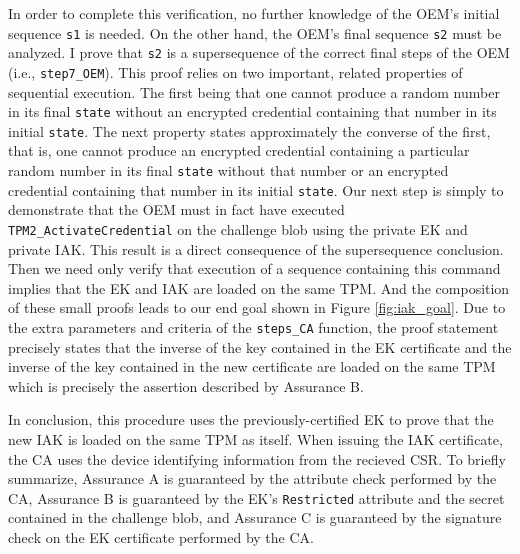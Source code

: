 \documentclass[runningheads]{llncs}
\begin{document}
In order to complete this verification, no further knowledge of the OEM's initial sequence \verb|s1| is needed.
On the other hand, the OEM's final sequence \verb|s2| must be analyzed.
I prove that \verb|s2| is a supersequence of the correct final steps of the OEM (i.e., \verb|step7_OEM|). This proof relies on two important, related properties of sequential execution. The first being that one cannot produce a random number in its final \verb|state| without an encrypted credential containing that number in its initial \verb|state|. The next property states approximately the converse of the first, that is, one cannot produce an encrypted credential containing a particular random number in its final \verb|state| without that number or an encrypted credential containing that number in its initial \verb|state|.
Our next step is simply to demonstrate that the OEM must in fact have executed \verb|TPM2_ActivateCredential| on the challenge blob using the private EK and private IAK. This result is a direct consequence of the supersequence conclusion. Then we need only verify that execution of a sequence containing this command implies that the EK and IAK are loaded on the same TPM. And the composition of these small proofs leads to our end goal shown in Figure 
\ref{fig:iak_goal}.
Due to the extra parameters and criteria of the
\verb|steps_CA| function, the proof statement precisely states that the inverse of the key contained in
the EK certificate and the inverse of the key contained in the new certificate are loaded on the
same TPM which is precisely the assertion described by Assurance B.

In conclusion, this procedure uses the previously-certified EK to prove that the new IAK is
loaded on the same TPM as itself. When issuing the IAK certificate, the CA uses the device identifying information from the recieved CSR.
To briefly summarize, Assurance A
is guaranteed by the attribute check performed by the CA, Assurance B is guaranteed by the EK's
\verb|Restricted| attribute and the secret contained in the challenge blob, and Assurance C is guaranteed by the signature check on the EK certificate performed by the CA.
\end{document}
